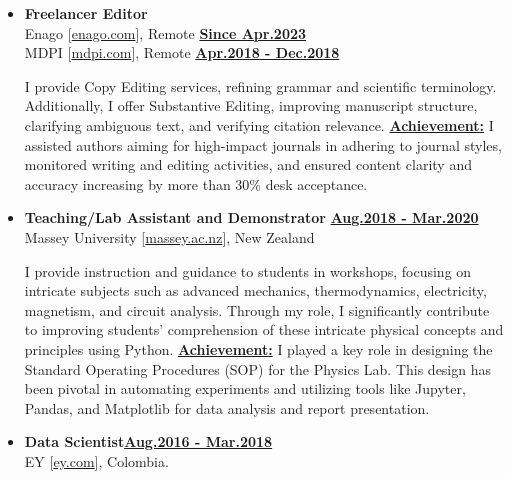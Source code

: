 \begin{itemize}[leftmargin=5mm]
    \item \textbf{\large Freelancer Editor}\\
          Enago [\href{https://www.enago.com/}{enago.com}], Remote \hfill
          \href{.}{\bf Since Apr.2023}\\
          MDPI [\href{https://www.mdpi.com/}{mdpi.com}], Remote \hfill
          \href{.}{\bf Apr.2018 - Dec.2018}

          {\noindent
              I provide Copy Editing services, refining grammar and scientific terminology. Additionally, I offer Substantive Editing, improving manuscript structure, clarifying ambiguous text, and verifying citation relevance.
              \textbf{\href{.}{Achievement:}} I assisted authors aiming for high-impact journals in adhering to journal styles, monitored writing and editing activities, and ensured content clarity and accuracy increasing by more than 30\% desk acceptance.
          }

    \item \textbf{\large Teaching/Lab Assistant and Demonstrator} \hfill \href{.}{\bf Aug.2018 - Mar.2020}\\
          Massey University [\href{www.massey.ac.nz}{massey.ac.nz}],
          New Zealand

              {\noindent
                  I provide instruction and guidance to students in workshops, focusing on intricate subjects such as advanced mechanics, thermodynamics, electricity, magnetism, and circuit analysis. Through my role, I significantly contribute to improving students' comprehension of these intricate physical concepts and principles using Python.
                  \textbf{\href{.}{Achievement:}} I played a key role in designing the Standard Operating Procedures (SOP) for the Physics Lab. This design has been pivotal in automating experiments and utilizing tools like Jupyter, Pandas, and Matplotlib for data analysis and report presentation.

              }

    \item \textbf{\large Data Scientist}\hfill \href{.}{\bf Aug.2016 - Mar.2018}\\
          EY [\href{www.ey.com}{ey.com}],
          Colombia.


\end{itemize}
